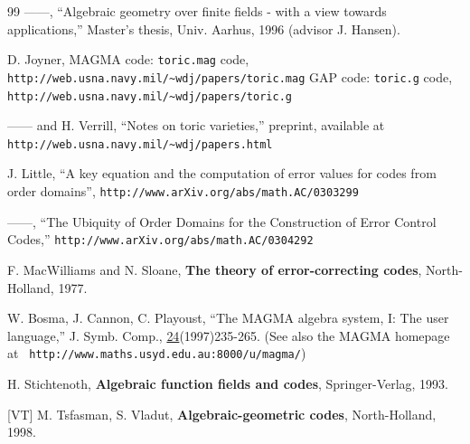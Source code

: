 \documentclass[12pt]{article}
\begin{document}
\begin{thebibliography}{99}
 ------, ``Algebraic geometry over finite fields - 
with a view towards
applications,'' Master's thesis, Univ. Aarhus, 1996 (advisor J. Hansen).

 D. Joyner, MAGMA code: \verb+toric.mag+ code,
\newline
\verb+http://web.usna.navy.mil/~wdj/papers/toric.mag+
\newline
GAP code: \verb+toric.g+ code,
\newline
\verb+http://web.usna.navy.mil/~wdj/papers/toric.g+

 ------ and H. Verrill, ``Notes on toric varieties,''
preprint, available at
\newline
\verb+http://web.usna.navy.mil/~wdj/papers.html+

 J. Little, ``A key equation and the computation of error 
values for codes from order domains'',
\newline
\verb+http://www.arXiv.org/abs/math.AC/0303299+

 ------, ``The Ubiquity of Order Domains for 
the Construction of Error Control Codes,'' 
\newline
\verb+http://www.arXiv.org/abs/math.AC/0304292+

F. MacWilliams and N. Sloane, {\bf The theory of error-correcting codes},
North-Holland, 1977.

W. Bosma, J. Cannon, C. Playoust,
``The MAGMA algebra system, I: The user language,''
J. Symb. Comp., \underline{24}(1997)235-265.
\newline
(See also the MAGMA homepage at
\newline
\verb+ http://www.maths.usyd.edu.au:8000/u/magma/+)

 H. Stichtenoth, {\bf Algebraic function
fields and codes}, Springer-Verlag, 1993.

[VT] M. Tsfasman,
S. Vladut, {\bf Algebraic-geometric codes}, North-Holland, 1998.

\end{thebibliography}
\end{document}
